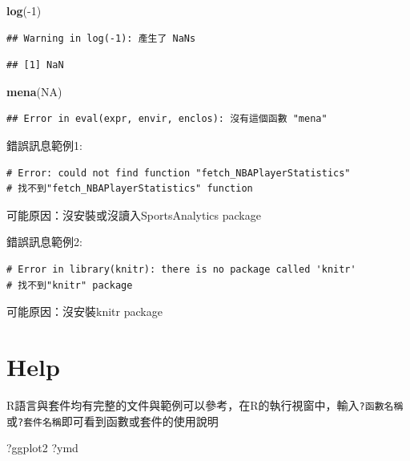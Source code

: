 \documentclass[]{book}
\newenvironment{Shaded}{\begin{snugshade}}{\end{snugshade}}
\newcommand{\KeywordTok}[1]{\textcolor[rgb]{0.13,0.29,0.53}{\textbf{{#1}}}}
\newcommand{\DecValTok}[1]{\textcolor[rgb]{0.00,0.00,0.81}{{#1}}}
\newcommand{\OtherTok}[1]{\textcolor[rgb]{0.56,0.35,0.01}{{#1}}}
\newcommand{\NormalTok}[1]{{#1}}
\theoremstyle{definition}
\theoremstyle{definition}
\theoremstyle{remark}
\begin{document}
\begin{Shaded}
\begin{Highlighting}[]
\KeywordTok{log}\NormalTok{(-}\DecValTok{1}\NormalTok{)}
\end{Highlighting}
\end{Shaded}

\begin{verbatim}
## Warning in log(-1): 產生了 NaNs
\end{verbatim}

\begin{verbatim}
## [1] NaN
\end{verbatim}

\begin{Shaded}
\begin{Highlighting}[]
\KeywordTok{mena}\NormalTok{(}\OtherTok{NA}\NormalTok{)}
\end{Highlighting}
\end{Shaded}

\begin{verbatim}
## Error in eval(expr, envir, enclos): 沒有這個函數 "mena"
\end{verbatim}

錯誤訊息範例1:

\begin{verbatim}
# Error: could not find function "fetch_NBAPlayerStatistics"
# 找不到"fetch_NBAPlayerStatistics" function
\end{verbatim}

可能原因：沒安裝或沒讀入SportsAnalytics package

錯誤訊息範例2:

\begin{verbatim}
# Error in library(knitr): there is no package called 'knitr'
# 找不到"knitr" package
\end{verbatim}

可能原因：沒安裝knitr package

\section{Help}\label{help}

R語言與套件均有完整的文件與範例可以參考，在R的執行視窗中，輸入\texttt{?函數名稱}或\texttt{?套件名稱}即可看到函數或套件的使用說明

\begin{Shaded}
\begin{Highlighting}[]
\NormalTok{?ggplot2}
\NormalTok{?ymd}
\end{Highlighting}
\end{Shaded}
\end{document}
